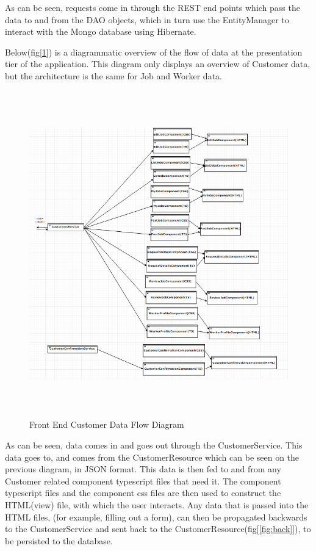 
\bigskip

As can be seen, requests come in through the REST end points which pass the data to and from the DAO objects, which in turn use the EntityManager to interact with the Mongo database using Hibernate.


Below(fig[\ref{fig:front}]) is a diagrammatic overview of the flow of data at the presentation tier of the application. This diagram only displays an overview of Customer data, but the architecture is the same for Job and Worker data. 

\begin{figure}[H]
    \centering
    \includegraphics[width=\textwidth, height=400pt]{DesignImages/FrontEnd.PNG}
    \caption{Front End Customer Data Flow Diagram}
    \label{fig:front}
\end{figure}

\bigskip

As can be seen, data comes in and goes out through the CustomerService. This data goes to, and comes from the CustomerResource which can be seen on the previous diagram, in JSON format. This data is then fed to and from any Customer related component typescript files that need it. The component typescript files and the component css files are then used to construct the HTML(view) file, with which the user interacts. Any data that is passed into the HTML files, (for example, filling out a form), can then be propagated backwards to the CustomerService and sent back to the CustomerResource(fig[\ref{fig:back}]), to be persisted to the database. 

